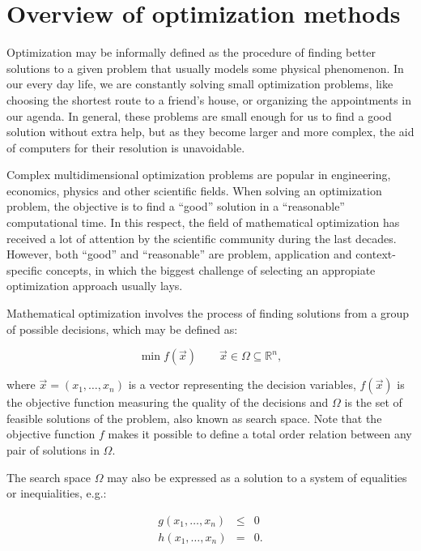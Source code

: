 
\chapter{Overview of optimization methods \label{chap:02-Optimization_models}}


\noindent Optimization may be informally defined as the procedure
of finding better solutions to a given problem that usually models
some physical phenomenon. In our every day life, we are constantly
solving small optimization problems, like choosing the shortest route
to a friend's house, or organizing the appointments in our agenda.
In general, these problems are small enough for us to find a good
solution without extra help, but as they become larger and more complex,
the aid of computers for their resolution is unavoidable.

Complex multidimensional optimization problems are popular in engineering,
economics, physics and other scientific fields. When solving an optimization
problem, the objective is to find a ``good'' solution in a ``reasonable''
computational time. In this respect, the field of mathematical optimization
has received a lot of attention by the scientific community during
the last decades. However, both ``good'' and ``reasonable'' are
problem, application and context-specific concepts, in which the biggest
challenge of selecting an appropiate optimization approach usually
lays.

Mathematical optimization involves the process of finding solutions
from a group of possible decisions, which may be defined as:

\begin{equation}
\min f(\vec{x})\qquad\vec{x}\in\Omega\subseteq\mathbb{R}^{n},
\end{equation}


\noindent where $\vec{x}=(x_{1},\dots,x_{n})$ is a vector representing
the decision variables, $f(\vec{x})$ is the objective function measuring
the quality of the decisions and $\Omega$ is the set of feasible
solutions of the problem, also known as search space. Note that the
objective function $f$ makes it possible to define a total order
relation between any pair of solutions in $\Omega$.

The search space $\Omega$ may also be expressed as a solution to
a system of equalities or inequialities, e.g.:

\begin{eqnarray}
g(x_{1},\dots,x_{n}) & \leq & 0\nonumber \\
h(x_{1},\dots,x_{n}) & = & 0.
\end{eqnarray}


